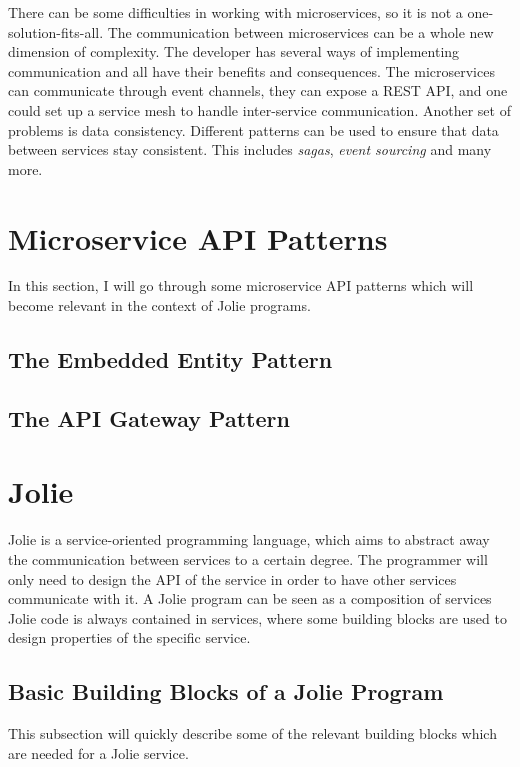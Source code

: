 There can be some difficulties in working with microservices, so it is not a one-solution-fits-all.
The communication between microservices can be a whole new dimension of complexity. The developer has several ways of implementing communication
and all have their benefits and consequences. The microservices can communicate through event channels, they can expose a REST API, and one could set up a service mesh to handle inter-service communication.
Another set of problems is data consistency. Different patterns can be used to ensure that data between services stay consistent. This includes \textit{sagas}, \textit{event sourcing} and many more.

\section{Microservice API Patterns}
In this section, I will go through some microservice API patterns which will become relevant in the context of Jolie programs.

\subsection{The Embedded Entity Pattern}
\subsection{The API Gateway Pattern}

\section{Jolie}
Jolie is a service-oriented programming language, which aims to abstract away the communication between services to a certain degree.
The programmer will only need to design the API of the service in order to have other services communicate with it.
A Jolie program can be seen as a composition of services
Jolie code is always contained in services, where some building blocks are used to design properties of the specific service.

\subsection{Basic Building Blocks of a Jolie Program}
This subsection will quickly describe some of the relevant building blocks which are needed for a Jolie service.

